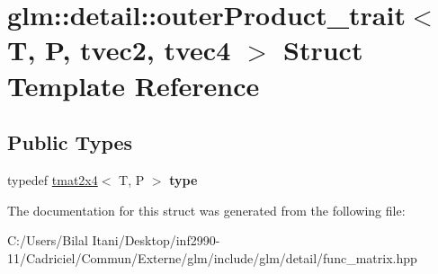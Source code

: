 \hypertarget{structglm_1_1detail_1_1outer_product__trait_3_01_t_00_01_p_00_01tvec2_00_01tvec4_01_4}{}\section{glm\+:\+:detail\+:\+:outer\+Product\+\_\+trait$<$ T, P, tvec2, tvec4 $>$ Struct Template Reference}
\label{structglm_1_1detail_1_1outer_product__trait_3_01_t_00_01_p_00_01tvec2_00_01tvec4_01_4}
\subsection*{Public Types}
\begin{DoxyCompactItemize}
\item 
typedef \hyperlink{structglm_1_1detail_1_1tmat2x4}{tmat2x4}$<$ T, P $>$ {\bfseries type}\hypertarget{structglm_1_1detail_1_1outer_product__trait_3_01_t_00_01_p_00_01tvec2_00_01tvec4_01_4_a5ca49ab58d1c30d858b622c06147cd57}{}\label{structglm_1_1detail_1_1outer_product__trait_3_01_t_00_01_p_00_01tvec2_00_01tvec4_01_4_a5ca49ab58d1c30d858b622c06147cd57}

\end{DoxyCompactItemize}


The documentation for this struct was generated from the following file\+:\begin{DoxyCompactItemize}
\item 
C\+:/\+Users/\+Bilal Itani/\+Desktop/inf2990-\/11/\+Cadriciel/\+Commun/\+Externe/glm/include/glm/detail/func\+\_\+matrix.\+hpp\end{DoxyCompactItemize}
